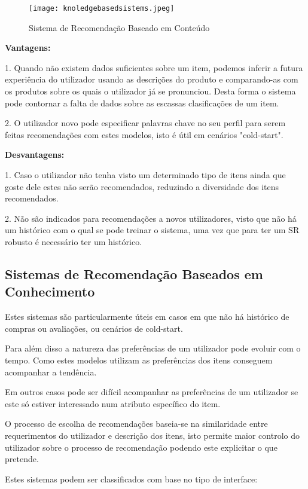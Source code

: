 \begin{figure}[H]
  \centering
    \texttt{[image: knoledgebasedsistems.jpeg]}
    \caption{Sistema de Recomendação Baseado em Conteúdo}
    \label{fig03}
\end{figure}

\textbf{Vantagens:}\hfill
\hfill
\par 1. Quando não existem dados suficientes sobre um item, podemos inferir a futura experiência do utilizador usando as descrições do produto e comparando-as com os produtos sobre os quais o utilizador já se pronunciou. Desta forma o sistema pode contornar a falta de dados sobre as escassas clasificações de um item.\newline
\hfill
\par 2. O utilizador novo pode especificar palavras chave no seu perfil para serem feitas recomendações com estes modelos, isto é útil em cenários "cold-start".\newline

\textbf{Desvantagens:}\hfill
\hfill
\par 1. Caso o utilizador não tenha visto um determinado tipo de itens ainda que goste dele estes não serão recomendados, reduzindo a diversidade dos itens recomendados.\newline
\hfill
\par 2. Não são indicados para recomendações a novos utilizadores, visto que não há um histórico com o qual se pode treinar o sistema, uma vez que para ter um SR robusto é necessário ter um histórico.\newline


\subsection{Sistemas de Recomendação Baseados em Conhecimento}
\hfill
\par Estes sistemas são particularmente úteis em casos em que não há histórico de compras ou avaliações, ou cenários de cold-start.
\par Para além disso a natureza das preferências de um utilizador pode evoluir com o tempo. Como estes modelos utilizam as preferências dos itens conseguem acompanhar a tendência. 
\par Em outros casos pode ser difícil acompanhar as preferências de um utilizador se este só estiver interessado num atributo específico do item.
\par O processo de escolha de recomendações baseia-se na similaridade entre requerimentos do utilizador e descrição dos itens, isto permite maior controlo do utilizador sobre o processo de recomendação podendo este explicitar o que pretende.
\par Estes sistemas podem ser classificados com base no tipo de interface:
\hfill
